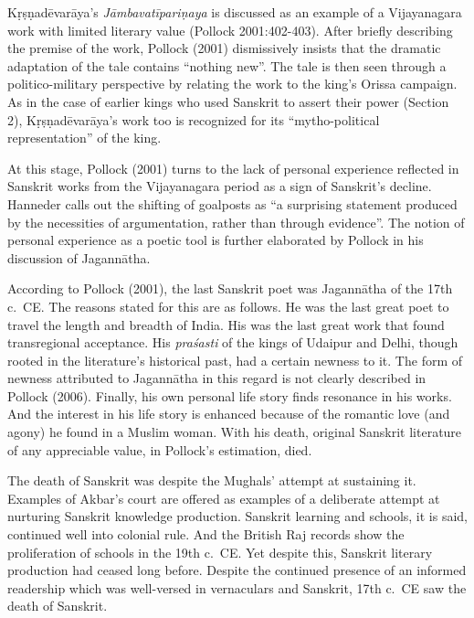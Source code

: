 Kṛṣṇadēvarāya’s {\sl Jāmbavatīpariṇaya} is discussed as an example of a Vijayanagara work with limited literary value (Pollock 2001:402-403). After briefly describing the premise of the work, Pollock (2001) dismissively insists that the dramatic adaptation of the tale contains “nothing new”. The tale is then seen through a politico-military perspective by relating the work to the king’s Orissa campaign. As in the case of earlier kings who used Sanskrit to assert their power (Section 2), Kṛṣṇadēvarāya’s work too is recognized for its “mytho-political representation” of the king.
\vskip 1.5pt

At this stage, Pollock (2001) turns to the lack of personal experience reflected in Sanskrit works from the Vijayanagara period as a sign of Sanskrit’s decline. Hanneder calls out the shifting of goalposts as “a surprising statement produced by the necessities of argumentation, rather than through evidence”. The notion of personal experience as a poetic tool is further elaborated by Pollock in his discussion of Jagannātha. 
\vskip 1.5pt

According to Pollock (2001), the last Sanskrit poet was Jagannātha of the 17th c.\ CE. The reasons stated for this are as follows. He was the last great poet to travel the length and breadth of India. His was the last great work that found transregional acceptance. His {\sl praśasti} of the kings of Udaipur and Delhi, though rooted in the literature’s historical past, had a certain newness to it. The form of newness attributed to Jagannātha in this regard is not clearly described in Pollock (2006). Finally, his own personal life story finds resonance in his works. And the interest in his life story is enhanced because of the romantic love (and agony) he found in a Muslim woman. With his death, original Sanskrit literature of any appreciable value, in Pollock’s estimation, died.
\vskip 1.5pt

The death of Sanskrit was despite the Mughals’ attempt at sustaining it. Examples of Akbar’s court are offered as examples of a deliberate attempt at nurturing Sanskrit knowledge production. Sanskrit learning and schools, it is said, continued well into colonial rule. And the British Raj records show the proliferation of schools in the 19th c.\ CE. Yet despite this, Sanskrit literary production had ceased long before. Despite the continued presence of an informed readership which was well-versed in vernaculars and Sanskrit, 17th c.\ CE saw the death of Sanskrit.

